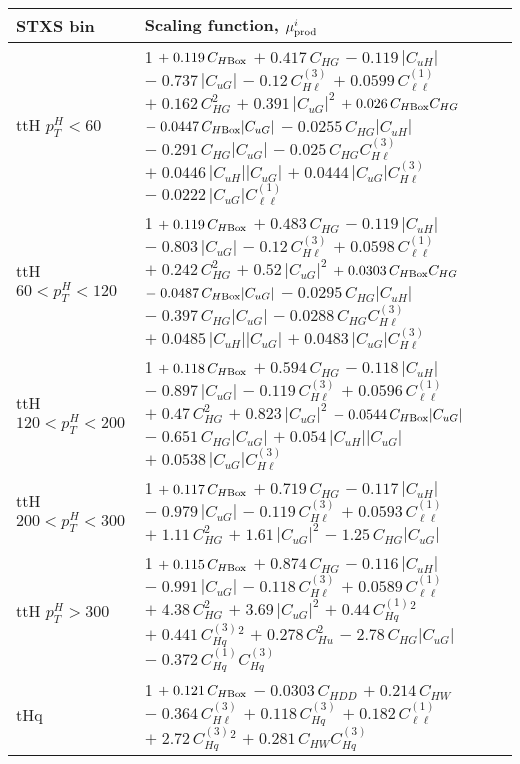 \begin{tabular}{l|p{}}
    \hline
    STXS bin & Scaling function, $\mu^i_{\rm{prod}}$ \\ \hline
    ttH $p_{T}^{H} < 60$ & 1 $+\;0.119\,C_{H\rm{Box}}$ $+\;0.417\,C_{HG}$ $-\;0.119\,|C_{uH}|$ $-\;0.737\,|C_{uG}|$ $-\;0.12\,C^{(3)}_{H\ell}$ $+\;0.0599\,C^{(1)}_{\ell\ell}$ $+\;0.162\,C_{HG}^{2}$ $+\;0.391\,|C_{uG}|^{2}$ $+\;0.026\,C_{H\rm{Box}}C_{HG}$ $-\;0.0447\,C_{H\rm{Box}}|C_{uG}|$ $-\;0.0255\,C_{HG}|C_{uH}|$ $-\;0.291\,C_{HG}|C_{uG}|$ $-\;0.025\,C_{HG}C^{(3)}_{H\ell}$ $+\;0.0446\,|C_{uH}||C_{uG}|$ $+\;0.0444\,|C_{uG}|C^{(3)}_{H\ell}$ $-\;0.0222\,|C_{uG}|C^{(1)}_{\ell\ell}$ \\
    ttH $60 < p_{T}^{H} < 120$ & 1 $+\;0.119\,C_{H\rm{Box}}$ $+\;0.483\,C_{HG}$ $-\;0.119\,|C_{uH}|$ $-\;0.803\,|C_{uG}|$ $-\;0.12\,C^{(3)}_{H\ell}$ $+\;0.0598\,C^{(1)}_{\ell\ell}$ $+\;0.242\,C_{HG}^{2}$ $+\;0.52\,|C_{uG}|^{2}$ $+\;0.0303\,C_{H\rm{Box}}C_{HG}$ $-\;0.0487\,C_{H\rm{Box}}|C_{uG}|$ $-\;0.0295\,C_{HG}|C_{uH}|$ $-\;0.397\,C_{HG}|C_{uG}|$ $-\;0.0288\,C_{HG}C^{(3)}_{H\ell}$ $+\;0.0485\,|C_{uH}||C_{uG}|$ $+\;0.0483\,|C_{uG}|C^{(3)}_{H\ell}$ \\
    ttH $120 < p_{T}^{H} < 200$ & 1 $+\;0.118\,C_{H\rm{Box}}$ $+\;0.594\,C_{HG}$ $-\;0.118\,|C_{uH}|$ $-\;0.897\,|C_{uG}|$ $-\;0.119\,C^{(3)}_{H\ell}$ $+\;0.0596\,C^{(1)}_{\ell\ell}$ $+\;0.47\,C_{HG}^{2}$ $+\;0.823\,|C_{uG}|^{2}$ $-\;0.0544\,C_{H\rm{Box}}|C_{uG}|$ $-\;0.651\,C_{HG}|C_{uG}|$ $+\;0.054\,|C_{uH}||C_{uG}|$ $+\;0.0538\,|C_{uG}|C^{(3)}_{H\ell}$ \\
    ttH $200 < p_{T}^{H} < 300$ & 1 $+\;0.117\,C_{H\rm{Box}}$ $+\;0.719\,C_{HG}$ $-\;0.117\,|C_{uH}|$ $-\;0.979\,|C_{uG}|$ $-\;0.119\,C^{(3)}_{H\ell}$ $+\;0.0593\,C^{(1)}_{\ell\ell}$ $+\;1.11\,C_{HG}^{2}$ $+\;1.61\,|C_{uG}|^{2}$ $-\;1.25\,C_{HG}|C_{uG}|$ \\
    ttH $p_{T}^{H} > 300$ & 1 $+\;0.115\,C_{H\rm{Box}}$ $+\;0.874\,C_{HG}$ $-\;0.116\,|C_{uH}|$ $-\;0.991\,|C_{uG}|$ $-\;0.118\,C^{(3)}_{H\ell}$ $+\;0.0589\,C^{(1)}_{\ell\ell}$ $+\;4.38\,C_{HG}^{2}$ $+\;3.69\,|C_{uG}|^{2}$ $+\;0.44\,C^{(1)}_{Hq}^{2}$ $+\;0.441\,C^{(3)}_{Hq}^{2}$ $+\;0.278\,C_{Hu}^{2}$ $-\;2.78\,C_{HG}|C_{uG}|$ $-\;0.372\,C^{(1)}_{Hq}C^{(3)}_{Hq}$ \\
    \hline
    tHq & 1 $+\;0.121\,C_{H\rm{Box}}$ $-\;0.0303\,C_{HDD}$ $+\;0.214\,C_{HW}$ $-\;0.364\,C^{(3)}_{H\ell}$ $+\;0.118\,C^{(3)}_{Hq}$ $+\;0.182\,C^{(1)}_{\ell\ell}$ $+\;2.72\,C^{(3)}_{Hq}^{2}$ $+\;0.281\,C_{HW}C^{(3)}_{Hq}$ \\
    \hline

\end{tabular}

